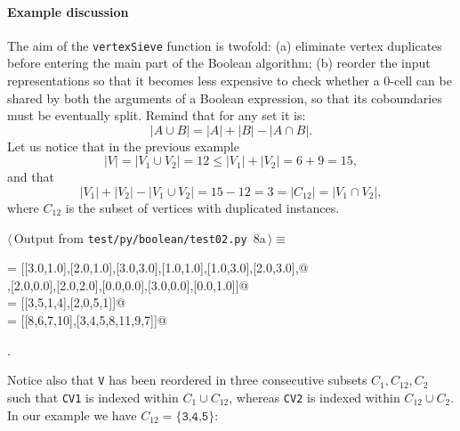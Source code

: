 \documentclass[11pt,oneside]{article}	%
\begin{document}
\paragraph{Example discussion} 
The aim of the \texttt{vertexSieve} function is twofold: (a) eliminate vertex duplicates before entering the main part of the Boolean algorithm; (b) reorder the input representations so that it becomes less expensive to check whether a 0-cell can be shared by both the arguments of a Boolean expression, so that its coboundaries must be eventually split. Remind that for any set it is:
\[
|A\cup B| = |A|+|B|-|A\cap B|.
\]
Let us notice that in the previous example
\[
|V| = |V_1 \cup V_2| = 12 \leq |V_1|+|V_2| = 6+9 = 15,
\]
and that 
\[
|V_1|+|V_2| - |V_1 \cup V_2| = 15 - 12 = 3 = |C_{12}| = |V_1 \cap V_2|,
\]
where $C_{12}$ is the subset of vertices with duplicated instances.
\begin{flushleft} \small \label{scrap10}
\protect{}$\langle\,$Output from \texttt{test/py/boolean/test02.py}\nobreak\ {\footnotesize 8a}$\,\rangle\equiv$
\vspace{-1ex}
\begin{list}{}{} \item
\mbox{}\verb@V   = [[3.0,1.0],[2.0,1.0],[3.0,3.0],[1.0,1.0],[1.0,3.0],[2.0,3.0],@\\
\mbox{}\verb@       [3.0,2.0],[2.0,0.0],[2.0,2.0],[0.0,0.0],[3.0,0.0],[0.0,1.0]]@\\
\mbox{} = [[3,5,1,4],[2,0,5,1]]@\\
\mbox{} = [[8,6,7,10],[3,4,5,8,11,9,7]]@\\
\mbox{}\verb@@{\NWsep}
\end{list}
\vspace{-1ex}
\footnotesize\addtolength{\baselineskip}{-1ex}
\begin{list}{}{\setlength{\itemsep}{-\parsep}\setlength{\itemindent}{-\leftmargin}}
\item {\NWtxtMacroNoRef}.
\end{list}
\end{flushleft}
Notice also that \texttt{V} has been reordered in three consecutive subsets $C_{1},C_{12},C_{2}$ such that \texttt{CV1} is indexed within $C_{1}\cup C_{12}$, whereas \texttt{CV2} is indexed within $C_{12}\cup C_{2}$. In our example we have  $C_{12}=\{\texttt{3,4,5}\}$: 
\end{document}
